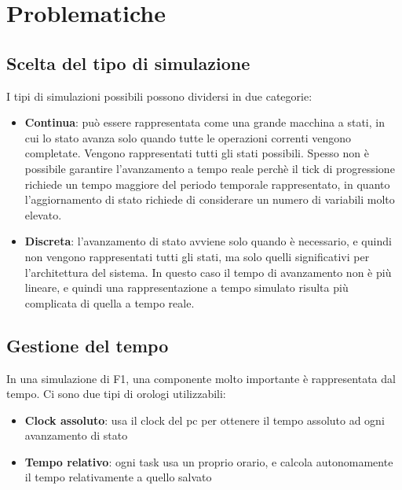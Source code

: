\chapter{Problematiche} %

\label{Chapter2} %



\section{Scelta del tipo di simulazione}

I tipi di simulazioni possibili possono dividersi in due categorie:
\begin{itemize}
 \item \textbf{Continua}: può essere rappresentata come una grande macchina a stati, in cui lo stato avanza solo quando tutte le operazioni correnti vengono completate. Vengono rappresentati tutti gli stati possibili. Spesso non è possibile garantire l'avanzamento a tempo reale perchè il tick di progressione richiede un tempo maggiore del periodo temporale rappresentato, in quanto l'aggiornamento di stato richiede di considerare un numero di variabili molto elevato.
 \item \textbf{Discreta}: l’avanzamento di stato avviene solo quando è necessario, e quindi non vengono rappresentati tutti gli stati, ma solo quelli significativi per l’architettura del sistema. In questo caso il tempo di avanzamento non è più lineare, e quindi una rappresentazione a tempo simulato risulta più complicata di quella a tempo reale.
\end{itemize}

\section{Gestione del tempo}

In una simulazione di F1, una componente molto importante è rappresentata dal tempo. Ci sono due tipi di orologi utilizzabili:
\begin{itemize}
 \item \textbf{Clock assoluto}: usa il clock del pc per ottenere il tempo assoluto ad ogni avanzamento di stato
 \item \textbf{Tempo relativo}: ogni task usa un proprio orario, e calcola autonomamente il tempo relativamente a quello salvato
\end{itemize}

